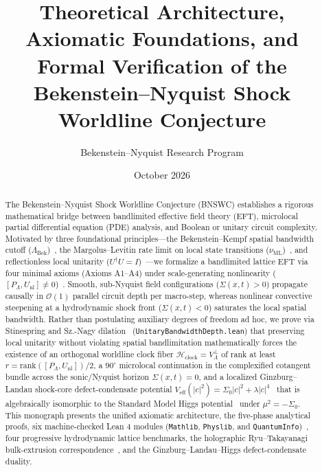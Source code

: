 \documentclass[11pt,a4paper]{article}
\title{\textbf{Theoretical Architecture, Axiomatic Foundations, and Formal Verification of the Bekenstein--Nyquist Shock Worldline Conjecture}}
\author{Bekenstein--Nyquist Research Program}
\date{October 2026}
\theoremstyle{definition}
\begin{document}
\sloppy
\maketitle
\begin{abstract}
The Bekenstein--Nyquist Shock Worldline Conjecture (BNSWC) establishes a rigorous mathematical bridge between bandlimited effective field theory (EFT), microlocal partial differential equation (PDE) analysis, and Boolean or unitary circuit complexity. Motivated by three foundational principles---the Bekenstein--Kempf spatial bandwidth cutoff ($\Lambda_{\text{Bek}}$)~\cite{bekenstein1981,casini2008,kempf2004}, the Margolus--Levitin rate limit on local state transitions ($\nu_{\text{ML}}$)~\cite{margolus1998,mandelstam1945}, and reflectionless local unitarity ($U^\dagger U = I$)~\cite{landauer1961,bennett1973}---we formalize a bandlimited lattice EFT via four minimal axioms (Axioms A1--A4) under scale-generating nonlinearity ($[P_{\Lambda}, U_{\text{nl}}] \ne 0$)~\cite{lax1968}. Smooth, sub-Nyquist field configurations ($\Sigma(x,t) > 0$) propagate causally in $\mathcal{O}(1)$ parallel circuit depth per macro-step, whereas nonlinear convective steepening at a hydrodynamic shock front ($\Sigma(x,t) < 0$) saturates the local spatial bandwidth. Rather than postulating auxiliary degrees of freedom ad hoc, we prove via Stinespring and Sz.-Nagy dilation~\cite{stinespring1955,sznagy1953} (\texttt{Unitary\allowbreak{}Bandwidth\allowbreak{}Depth.lean}) that preserving local unitarity without violating spatial bandlimitation mathematically forces the existence of an orthogonal worldline clock fiber $\mathcal{H}_{\text{clock}} = V_{\Lambda}^{\perp}$ of rank at least $r = \mathrm{rank}([P_{\Lambda}, U_{\text{nl}}])/2$, a $90^\circ$ microlocal continuation in the complexified cotangent bundle across the sonic/Nyquist horizon $\Sigma(x,t) = 0$, and a localized Ginzburg--Landau shock-core defect-condensate potential $V_{\text{eff}}(|c|^2) = \Sigma_0 |c|^2 + \lambda |c|^4$~\cite{ginzburg1950} that is algebraically isomorphic to the Standard Model Higgs potential~\cite{higgs1964,tooby2024} under $\mu^2 = -\Sigma_0$. This monograph presents the unified axiomatic architecture, the five-phase analytical proofs, six machine-checked Lean 4 modules (\texttt{Mathlib}, \texttt{Physlib}, and \texttt{QuantumInfo})~\cite{mathlib2020,tooby2024}, four progressive hydrodynamic lattice benchmarks, the holographic Ryu--Takayanagi bulk-extrusion correspondence~\cite{ryutakayanagi2006,swingle2012}, and the Ginzburg--Landau--Higgs defect-condensate duality.
\end{abstract}
\tableofcontents
\bigskip
\end{document}
